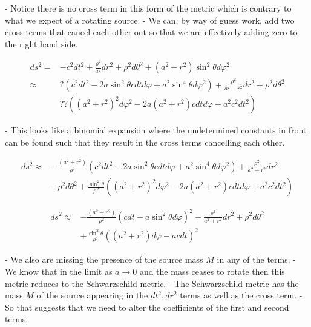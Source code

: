 - Notice there is no cross term in this form of the metric which is contrary to what we expect of a rotating source.
- We can, by way of guess work, add two cross terms that cancel each other out so that we are effectively adding zero to the right hand side.


\begin{align}
    d s^2=  & -c^2 d t^2+\frac{\rho^2}{a^2} d r^2+\rho^2 d \theta^2+\left(a^2+r^2\right) \sin ^2 \theta d \varphi^2                                    \\
    \approx & ?\left(c^2 d t^2-2 a \sin ^2 \theta c d t d \varphi+a^2 \sin ^4 \theta d \varphi^2\right)+\frac{\rho^2}{a^2+r^2} d r^2+\rho^2 d \theta^2 \\
            & ? ?\left(\left(a^2+r^2\right)^2 d \varphi^2-2 a\left(a^2+r^2\right) c d t d \varphi+a^2 c^2 d t^2\right)
\end{align}


- This looks like a binomial expansion where the undetermined constants in front can be found such that they result in the cross terms cancelling each other.


\begin{align}
    d s^2 \approx & -\frac{\left(a^2+r^2\right)}{\rho^2}\left(c^2 d t^2-2 a \sin ^2 \theta c d t d \varphi+a^2 \sin ^4 \theta d \varphi^2\right)+\frac{\rho^2}{a^2+r^2} d r^2 \\
                  & +\rho^2 d \theta^2+\frac{\sin ^2 \theta}{\rho^2}\left(\left(a^2+r^2\right)^2 d \varphi^2-2 a\left(a^2+r^2\right) c d t d \varphi+a^2 c^2 d t^2\right)
\end{align}

\begin{align}
    d s^2 \approx & -\frac{\left(a^2+r^2\right)}{\rho^2}\left(c d t-a \sin ^2 \theta d \varphi\right)^2+\frac{\rho^2}{a^2+r^2} d r^2+\rho^2 d \theta^2 \\
                  & +\frac{\sin ^2 \theta}{\rho^2}\left(\left(a^2+r^2\right) d \varphi-a c d t\right)^2
\end{align}


- We also are missing the presence of the source mass $M$ in any of the terms.
- We know that in the limit as $a \rightarrow 0$ and the mass ceases to rotate then this metric reduces to the Schwarzschild metric.
- The Schwarzschild metric has the mass $M$ of the source appearing in the $d t^2, d r^2$ terms as well as the cross term.
- So that suggests that we need to alter the coefficients of the first and second terms.


